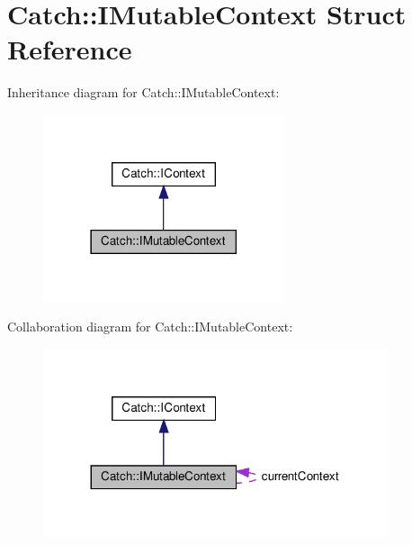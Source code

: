 \hypertarget{structCatch_1_1IMutableContext}{}\section{Catch\+:\+:I\+Mutable\+Context Struct Reference}
\label{structCatch_1_1IMutableContext}


Inheritance diagram for Catch\+:\+:I\+Mutable\+Context\+:
\nopagebreak
\begin{figure}[H]
\begin{center}
\leavevmode
\includegraphics[width=201pt]{structCatch_1_1IMutableContext__inherit__graph}
\end{center}
\end{figure}


Collaboration diagram for Catch\+:\+:I\+Mutable\+Context\+:
\nopagebreak
\begin{figure}[H]
\begin{center}
\leavevmode
\includegraphics[width=287pt]{structCatch_1_1IMutableContext__coll__graph}
\end{center}
\end{figure}
